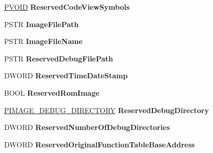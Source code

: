 \begin{DoxyCompactItemize}
\hyperlink{interfacevoid}{P\+V\+O\+ID} {\bfseries Reserved\+Code\+View\+Symbols}
\item 
\mbox{\label{struct___i_m_a_g_e___d_e_b_u_g___i_n_f_o_r_m_a_t_i_o_n_a3a7b71300d7d112894cb8dc175a4a7c4}} 
P\+S\+TR {\bfseries Image\+File\+Path}
\item 
\mbox{\label{struct___i_m_a_g_e___d_e_b_u_g___i_n_f_o_r_m_a_t_i_o_n_a309b1e49bf3a93d65d8c589b09c434a7}} 
P\+S\+TR {\bfseries Image\+File\+Name}
\item 
\mbox{\label{struct___i_m_a_g_e___d_e_b_u_g___i_n_f_o_r_m_a_t_i_o_n_ad59f47d358ba4a6d4a167af66d36ca53}} 
P\+S\+TR {\bfseries Reserved\+Debug\+File\+Path}
\item 
\mbox{\label{struct___i_m_a_g_e___d_e_b_u_g___i_n_f_o_r_m_a_t_i_o_n_a5ae3234eb622effad8e89b7927e9b360}} 
D\+W\+O\+RD {\bfseries Reserved\+Time\+Date\+Stamp}
\item 
\mbox{\label{struct___i_m_a_g_e___d_e_b_u_g___i_n_f_o_r_m_a_t_i_o_n_a496fd89bb13e2255727d1c9914c94a7f}} 
B\+O\+OL {\bfseries Reserved\+Rom\+Image}
\item 
\mbox{\label{struct___i_m_a_g_e___d_e_b_u_g___i_n_f_o_r_m_a_t_i_o_n_a0a247ec1aeeb5e9b4a93cadd85ecf195}} 
\hyperlink{struct___i_m_a_g_e___d_e_b_u_g___d_i_r_e_c_t_o_r_y}{P\+I\+M\+A\+G\+E\+\_\+\+D\+E\+B\+U\+G\+\_\+\+D\+I\+R\+E\+C\+T\+O\+RY} {\bfseries Reserved\+Debug\+Directory}
\item 
\mbox{\label{struct___i_m_a_g_e___d_e_b_u_g___i_n_f_o_r_m_a_t_i_o_n_a431bdb830b16187c91399f7aac109cb4}} 
D\+W\+O\+RD {\bfseries Reserved\+Number\+Of\+Debug\+Directories}
\item 
\mbox{\label{struct___i_m_a_g_e___d_e_b_u_g___i_n_f_o_r_m_a_t_i_o_n_a02484831a37a0ad0327095f462110dce}} 
D\+W\+O\+RD {\bfseries Reserved\+Original\+Function\+Table\+Base\+Address}

\end{DoxyCompactItemize}
